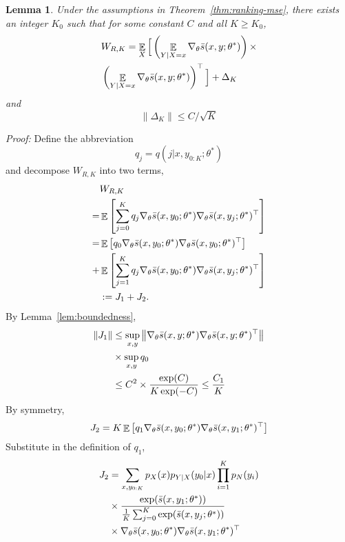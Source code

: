\documentclass[11pt,a4paper]{article}
\DeclareMathOperator{\E}{\mathbb{E}}
\newcommand{\gtheta}{\ensuremath \nabla_{\theta}}
\newcommand{\ssf}[3]{\bar{s}(#1, #2; #3)}
\newcommand{\vnorm}[1]{\left\| #1 \right\|}
\newtheorem{lemma}{Lemma}[section]
\begin{document}
\begin{lemma}
  Under the assumptions in Theorem~\ref{thm:ranking-mse}, there exists an integer $K_0$ such that for some constant $C$ and all $K \geq K_0$, 
\begin{equation*}
\begin{aligned}
   & W_{R, K} = \E_X \Big[\left(\E_{Y|X = x}\gtheta \ssf{x}{y}{\theta^*}\right) \times  \\
   &  \left(\E_{Y|X = x}\gtheta \ssf{x}{y}{\theta^*}\right)^\top \Big] + \Delta_K
\end{aligned}
\end{equation*}
and 
\[
\|\Delta_K\| \leq C/\sqrt{K} 
\]
  \label{lem:W_rk_bound}
\end{lemma}
{\em Proof: } Define the abbreviation
\[
q_j =  q( j | x, y_{0:K}; \theta^*)
\]
and decompose $W_{R, K}$ into two terms, 
\begin{equation}
  \begin{aligned}
  & W_{R, K} \\
  = & \E\left[ \sum_{j=0}^K  q_j \gtheta  \ssf{x}{y_0}{\theta^*}\gtheta \ssf{x}{y_j}{\theta^*}^\top\right]\\
  = & \E\left[   q_0 \gtheta  \ssf{x}{y_0}{\theta^*}\gtheta  \ssf{x}{y_0}{\theta^*}^\top\right] \\
  + & \E\left[ \sum_{j=1}^K  q_j \gtheta  \ssf{x}{y_0}{\theta^*}\gtheta \ssf{x}{y_j}{\theta^*}^\top\right]\\
  & := J_1 + J_2.
  \end{aligned}
  \nonumber
  \end{equation}
By Lemma~\ref{lem:boundedness}, 
\begin{equation*}
\begin{aligned}
   \vnorm{J_1} &\leq  \sup_{x, y} \vnorm{ \gtheta  \ssf{x}{y}{\theta^*}\gtheta  \ssf{x}{y}{\theta^*}^\top}  \\
   & \times  \sup_{x, y} q_0\\
   & \leq C^2 \times \frac{\exp(C)}{K\exp(-C)} \leq \frac{C_1}{K}
\end{aligned}
\end{equation*}
By symmetry, 
\[
J_2 = K \E\left[ q_1 \gtheta  \ssf{x}{y_0}{\theta^*}\gtheta   \ssf{x}{y_1}{\theta^*}^\top\right]
\]
Substitute in the definition of $q_1$, 
\begin{equation*}
\begin{aligned}
 J_2 & = \sum_{x, y_{0:K}} p_{X}(x)p_{Y|X}(y_0|x)\prod_{i=1}^K p_N(y_i)  \\
 & \times \frac{\exp(  \ssf{x}{y_1}{\theta^*}) }{ \frac{1}{K}\sum_{j=0}^K \exp(\ssf{x}{y_j}{\theta^*} ) }  \\
 & \times \gtheta \ssf{x}{y_0}{\theta^*}\gtheta   \ssf{x}{y_1}{\theta^*}^\top  
\end{aligned}
\end{equation*}
\end{document}
